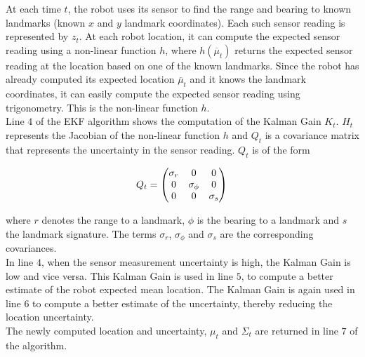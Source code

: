 \documentclass[conference]{IEEEtran}
\begin{document}
At each time $t$, the robot uses its sensor to find the range and bearing to known landmarks (known $x$ and $y$ landmark coordinates). Each such sensor reading is represented by $z_t$. At each robot location, it can compute the expected sensor reading using a non-linear function $h$, where $h(\overline \mu_t)$ returns the expected sensor reading at the location based on one of the known landmarks. Since the robot has already computed its expected location $\overline \mu_t$ and it knows the landmark coordinates, it can easily compute the expected sensor reading using trigonometry. This is the non-linear function $h$.\\

Line $4$ of the EKF algorithm shows the computation of the Kalman Gain $K_t$.  $H_t$ represents the Jacobian of the non-linear function $h$ and $Q_t$ is a covariance matrix that represents the uncertainty in the sensor reading. $Q_t$ is of the form

\begin{equation}\label{StateVector}
Q_t = \begin{pmatrix}
		\sigma_r &0 &0\\
		0 &\sigma_{\phi} &0\\
		0 &0 &\sigma_{s}
	   \end{pmatrix}\\
\end{equation}

where $r$ denotes the range to a landmark, $\phi$ is the bearing to a landmark and $s$ the landmark signature. The terms $\sigma_r$, $\sigma_{\phi}$ and $\sigma_{s}$ are the corresponding covariances.\\

In line $4$, when the sensor measurement uncertainty is high, the Kalman Gain is low and vice versa. This Kalman Gain is used in line $5$, to compute a better estimate of the robot expected mean location. The Kalman Gain is again used in line $6$ to compute a better estimate of the uncertainty, thereby reducing the location uncertainty.\\

The newly computed location and uncertainty, $\mu_t$ and $\Sigma_t$ are returned in line $7$ of the algorithm.\\
\end{document}

